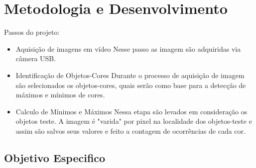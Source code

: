 

\chapter{Metodologia e Desenvolvimento} \label{Cap:Processamento}


Passos do projeto:
\begin{itemize}
	\item Aquisição de imagens em vídeo
			\subitem Nesse passo as imagem são adquiridas via câmera USB.
	\item Identificação de Objetos-Cores
			\subitem Durante o processo de aquisição de imagem são selecionados os objetos-cores, quais serão como base para a detecção de máximos e mínimos de cores.
	\item Calculo de Mínimos e Máximos
		\subitem Nessa etapa são levados em consideração os objetos teste. A imagem é "varida"  por pixel na localidade dos objetos-teste e assim são salvos seus valores e feito a contagem de ocorrências de cada cor.		

\end{itemize}
\section{Objetivo Especifico}
